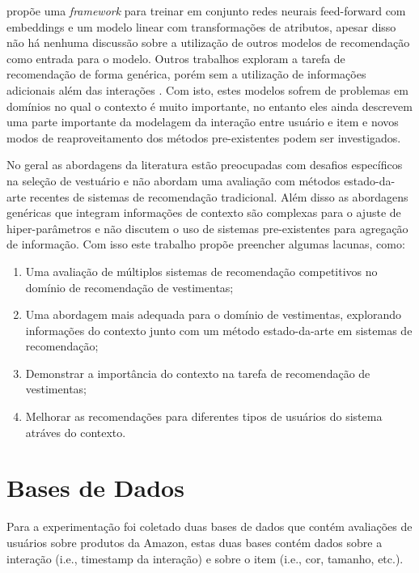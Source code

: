 \documentclass[sigconf]{acmart}
\begin{document}
\citeauthor{cheng2016wide} propõe uma \textit{framework} para treinar em conjunto redes neurais feed-forward com embeddings e um modelo linear com transformações de atributos, apesar disso não há nenhuma discussão sobre a utilização de outros modelos de recomendação como entrada para o modelo. Outros trabalhos exploram a tarefa de recomendação de forma genérica, porém sem a utilização de informações adicionais além das interações \cite{he2020lightgcn,he2017neural,wu2021self}. Com isto, estes modelos sofrem de problemas em domínios no qual o contexto é muito importante, no entanto eles ainda descrevem uma parte importante da modelagem da interação entre usuário e item e novos modos de reaproveitamento dos métodos pre-existentes podem ser investigados.

No geral as abordagens da literatura estão preocupadas com desafios específicos na seleção de vestuário e não abordam uma avaliação com métodos estado-da-arte recentes de sistemas de recomendação tradicional. Além disso as abordagens genéricas que integram informações de contexto são complexas para o ajuste de hiper-parâmetros e não discutem o uso de sistemas pre-existentes para agregação de informação. Com isso este trabalho propõe preencher algumas lacunas, como:

\begin{enumerate}
  \item Uma avaliação de múltiplos sistemas de recomendação competitivos no domínio de recomendação de vestimentas;
  \item Uma abordagem mais adequada para o domínio de vestimentas, explorando informações do contexto junto com um método estado-da-arte em sistemas de recomendação;
  \item Demonstrar a importância do contexto na tarefa de recomendação de vestimentas;
  \item Melhorar as recomendações para diferentes tipos de usuários do sistema atráves do contexto.
\end{enumerate}


\section{Bases de Dados}

Para a experimentação foi coletado duas bases de dados que contém avaliações de usuários sobre produtos da Amazon, estas duas bases contém dados sobre a interação (i.e., timestamp da interação) e sobre o item (i.e., cor, tamanho, etc.).
\end{document}
